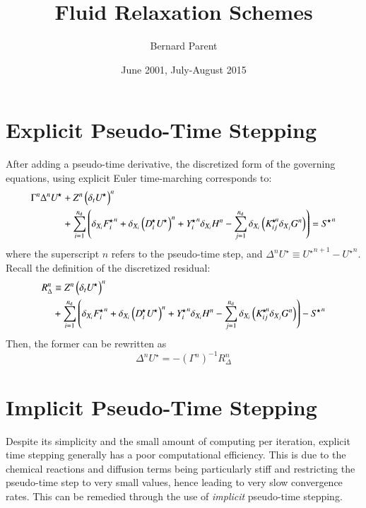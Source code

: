 \documentclass{warpdoc}
\author{
  Bernard Parent
}
\title{
  Fluid Relaxation Schemes
}
\date{
  June 2001, July-August 2015
}
\newcommand{\alb}{\vspace{0.2cm}\\} %
\newcommand{\nd}{{n_{\rm d}}}
\newcommand{\Dstar}{D^{\!\star}}
\newcommand{\Fstar}{F^{\!\star}}
\newcommand{\Ustar}{U^{\!\star}}
\newcommand{\Sstar}{S^{\!\star}}
\newcommand{\Kstar}{K^{\!\star}}
\newcommand{\Ystar}{Y^{\!\star}}
\begin{document}
  \pagestyle{headings}
  \setcounter{page}{1}
  \makewarpdoctitle
  \tableofcontents
\sloppy



\section{Explicit Pseudo-Time Stepping}

After adding a pseudo-time derivative, the discretized form of the governing equations, using explicit Euler
time-marching corresponds to:
%
\begin{align}
   \Gamma^n {\Delta^n {\Ustar}}
  &+  Z^n \left(\delta_t \Ustar\right)^n \nonumber\alb
  &+ \sum_{i=1}^{\nd}
      \left(  \delta_{X_i} {\Fstar_i}^{n} 
            + \delta_{X_i} \left({\Dstar_i} \Ustar\right)^n
            + {\Ystar_i}^n \delta_{X_i} H^n
            - \sum_{j=1}^{\nd} \delta_{X_i} \left(  {\Kstar_{ij}}^{\!\! n} \delta_{X_j} G^{n}\right) \right)
 ={\Sstar}^{n}
\end{align}
%
where the superscript $n$ refers to the pseudo-time step,
and $\Delta^n {\Ustar}\equiv {\Ustar}^{n+1}-{\Ustar}^n$. Recall the definition of the discretized
residual:
%
\begin{align}
R_\Delta^n &\equiv  Z^n \left(\delta_t \Ustar\right)^n \nonumber\alb
  &+ \sum_{i=1}^{\nd}
      \left(  \delta_{X_i} {\Fstar_i}^{n} 
            + \delta_{X_i} \left({\Dstar_i} \Ustar\right)^n
            + {\Ystar_i}^n \delta_{X_i} H^n
            - \sum_{j=1}^{\nd} \delta_{X_i} \left(  {\Kstar_{ij}}^{\!\! n} \delta_{X_j} G^{n}\right) \right)
 -{\Sstar}^{n}
\label{eqn:Rdelta}
\end{align}
%
Then, the former can be rewritten as
%
\begin{equation}
     \Delta^n{\Ustar}=   - \left(\Gamma^n\right)^{-1} R_\Delta^n
\end{equation}
%




\section{Implicit Pseudo-Time Stepping}

Despite its simplicity and the small amount of computing per iteration, explicit time stepping generally has a poor computational efficiency. This is due to the chemical reactions and diffusion terms being particularly stiff and restricting the pseudo-time step to very small values, hence leading to very slow convergence rates. This can be remedied through the use of \emph{implicit} pseudo-time stepping.
\end{document}
